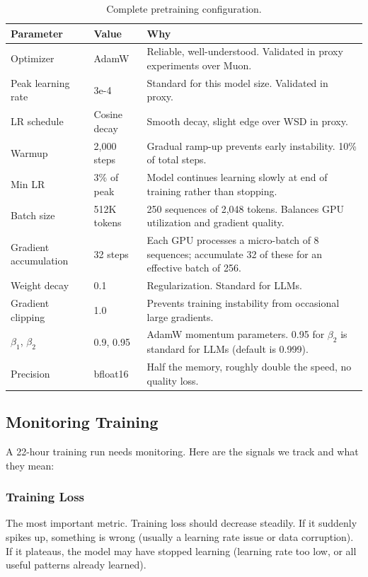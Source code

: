 \documentclass[11pt,a4paper]{article}
\begin{document}
\begin{table}[H]
\centering
\begin{tabular}{llp{6.5cm}}
\toprule
\textbf{Parameter} & \textbf{Value} & \textbf{Why} \\
\midrule
Optimizer & AdamW & Reliable, well-understood. Validated in proxy experiments over Muon. \\
Peak learning rate & 3e-4 & Standard for this model size. Validated in proxy. \\
LR schedule & Cosine decay & Smooth decay, slight edge over WSD in proxy. \\
Warmup & 2,000 steps & Gradual ramp-up prevents early instability. 10\% of total steps. \\
Min LR & 3\% of peak & Model continues learning slowly at end of training rather than stopping. \\
Batch size & 512K tokens & 250 sequences of 2,048 tokens. Balances GPU utilization and gradient quality. \\
Gradient accumulation & 32 steps & Each GPU processes a micro-batch of 8 sequences; accumulate 32 of these for an effective batch of 256. \\
Weight decay & 0.1 & Regularization. Standard for LLMs. \\
Gradient clipping & 1.0 & Prevents training instability from occasional large gradients. \\
$\beta_1$, $\beta_2$ & 0.9, 0.95 & AdamW momentum parameters. 0.95 for $\beta_2$ is standard for LLMs (default is 0.999). \\
Precision & bfloat16 & Half the memory, roughly double the speed, no quality loss. \\
\bottomrule
\end{tabular}
\caption{Complete pretraining configuration.}
\label{tab:pretrain_config}
\end{table}

\subsection{Monitoring Training}

A 22-hour training run needs monitoring. Here are the signals we track and what they mean:

\subsubsection{Training Loss}

The most important metric. Training loss should decrease steadily. If it suddenly spikes up, something is wrong (usually a learning rate issue or data corruption). If it plateaus, the model may have stopped learning (learning rate too low, or all useful patterns already learned).
\end{document}
